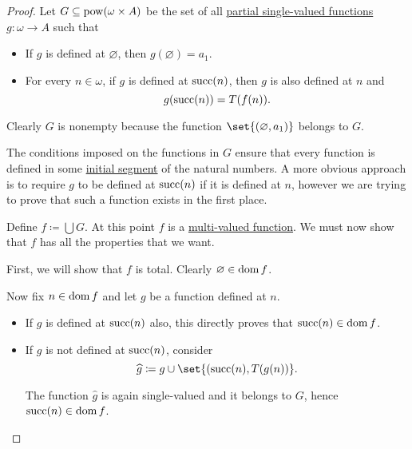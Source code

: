 \begin{proof}
  Let \( G \subseteq \operatorname{pow}(\omega \times A) \) be the set of all \hyperref[def:partial_function]{partial single-valued functions} \( g: \omega \to A \) such that
  \begin{itemize}
    \item If \( g \) is defined at \( \varnothing \), then \( g(\varnothing) = a_1 \).
    \item For every \( n \in \omega \), if \( g \) is defined at \( \operatorname{succ}(n) \), then \( g \) is also defined at \( n \) and
    \begin{equation*}
      g(\operatorname{succ}(n)) = T(f(n)).
    \end{equation*}
  \end{itemize}

  Clearly \( G \) is nonempty because the function \( \set{ (\varnothing, a_1) } \) belongs to \( G \).

  The conditions imposed on the functions in \( G \) ensure that every function is defined in some \hyperref[def:poset_interval/ray]{initial segment} of the natural numbers. A more obvious approach is to require \( g \) to be defined at \( \operatorname{succ}(n) \) if it is defined at \( n \), however we are trying to prove that such a function exists in the first place.

  Define \( f \coloneqq \bigcup G \). At this point \( f \) is a \hyperref[def:multi_valued_function]{multi-valued function}. We must now show that \( f \) has all the properties that we want.

   First, we will show that \( f \) is total. Clearly \( \varnothing \in \operatorname{dom} f \).

  Now fix \( n \in \operatorname{dom} f \) and let \( g \) be a function defined at \( n \).

  \begin{itemize}
    \item If \( g \) is defined at \( \operatorname{succ}(n) \) also, this directly proves that \( \operatorname{succ}(n) \in \operatorname{dom} f \).
    \item If \( g \) is not defined at \( \operatorname{succ}(n) \), consider
    \begin{equation*}
      \widehat g \coloneqq g \cup \set{ (\op{succ}(n), T(g(n)) }.
    \end{equation*}

    The function \( \widehat g \) is again single-valued and it belongs to \( G \), hence \( \operatorname{succ}(n) \in \operatorname{dom} f \).
  \end{itemize}


\end{proof}
